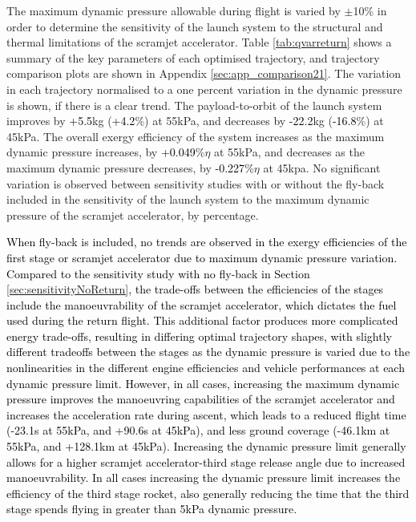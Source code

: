 The maximum dynamic pressure allowable during flight is varied by $\pm$10\% in order to determine the sensitivity of the launch system to the structural and thermal limitations of the scramjet accelerator.  
Table \ref{tab:qvarreturn} shows a summary of the key parameters of each optimised trajectory, and trajectory comparison plots are shown in Appendix \ref{sec:app_comparison21}. The variation in each trajectory normalised to a one percent variation in the dynamic pressure is shown, if there is a clear trend. The payload-to-orbit of the launch system improves by \textcolor{black}{+5.5}kg (\textcolor{black}{+4.2}\%) at 55kPa, and decreases by \textcolor{black}{-22.2}kg (\textcolor{black}{-16.8}\%) at 45kPa.
The overall exergy efficiency of the system increases as the maximum dynamic pressure increases, by \textcolor{black}{+0.049}\%$\eta$ at 55kPa, and decreases as the maximum dynamic pressure decreases, by \textcolor{black}{-0.227}\%$\eta$ at 45kpa. 
No significant variation is observed between sensitivity studies with or without the fly-back included in the sensitivity of the launch system to the maximum dynamic pressure of the scramjet accelerator, by percentage.

\textcolor{black}{
When fly-back is included, no trends are observed in the exergy efficiencies of the first stage or scramjet accelerator due to maximum dynamic pressure variation. Compared to the sensitivity study with no fly-back in Section \ref{sec:sensitivityNoReturn}, the trade-offs between the efficiencies of the stages include the manoeuvrability of the scramjet accelerator, which dictates the fuel used during the return flight. This additional factor produces more complicated energy trade-offs, resulting in differing optimal trajectory shapes, with slightly different tradeoffs between the stages as the dynamic pressure is varied due to the nonlinearities in the different engine efficiencies and vehicle performances at each dynamic pressure limit.
However, in all cases, increasing the maximum dynamic pressure improves the manoeuvring capabilities of the scramjet accelerator and increases the acceleration rate during ascent, which leads to a reduced flight time (-23.1s at 55kPa, and +90.6s at 45kPa), and less ground coverage (-46.1km at 55kPa, and +128.1km at 45kPa). Increasing the dynamic pressure limit generally allows for a higher scramjet accelerator-third stage release angle due to increased manoeuvrability. In all cases increasing the dynamic pressure limit increases the efficiency of the third stage rocket, also generally reducing the time that the third stage spends flying in greater than 5kPa dynamic pressure. }


